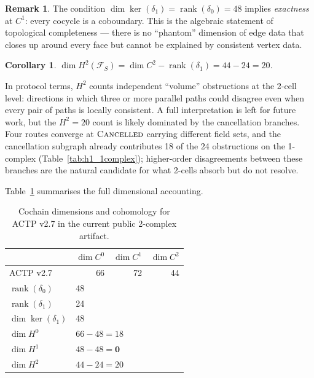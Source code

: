 \documentclass[11pt]{article}
\theoremstyle{plain}
\newtheorem{corollary}[theorem]{Corollary}
\theoremstyle{definition}
\newtheorem{remark}[theorem]{Remark}
\newcommand{\Fsh}{\mathcal{F}}         %
\newcommand{\Czero}{C^{0}}
\newcommand{\Cone}{C^{1}}
\newcommand{\Ctwo}{C^{2}}
\newcommand{\Hzero}{H^{0}}
\newcommand{\Hone}{H^{1}}
\newcommand{\Htwo}{H^{2}}
\newcommand{\deltazero}{\delta_{0}}
\newcommand{\deltaone}{\delta_{1}}
\newcommand{\rank}{\operatorname{rank}}
\newcommand{\dimn}{\operatorname{dim}}
\newcommand{\sCANC}{\textsc{Cancelled}}
\begin{document}
\begin{remark}
The condition $\dimn\ker(\deltaone) = \rank(\deltazero) = 48$ implies
\emph{exactness} at $\Cone$: every cocycle is a coboundary.  This is
the algebraic statement of topological completeness --- there is no
``phantom'' dimension of edge data that closes up around every face but
cannot be explained by consistent vertex data.
\end{remark}

\begin{corollary}
$\dimn\Htwo(\Fsh_S) = \dimn\Ctwo - \rank(\deltaone) = 44 - 24 = 20$.
\end{corollary}

In protocol terms, $\Htwo$ counts independent ``volume'' obstructions at the
2-cell level: directions in which three or more parallel paths could disagree
even when every pair of paths is locally consistent.  A full interpretation
is left for future work, but the $\Htwo = 20$ count is likely dominated by
the cancellation branches.  Four routes converge at $\sCANC$ carrying
different field sets, and the cancellation subgraph already contributes 18 of
the 24 obstructions on the 1-complex (Table~\ref{tab:h1_1complex});
higher-order disagreements between these branches are the natural candidate
for what 2-cells absorb but do not resolve.

Table~\ref{tab:dimensions} summarises the full dimensional accounting.

\begin{table}[h]
\centering
\caption{Cochain dimensions and cohomology for ACTP v2.7 in the current public 2-complex artifact.}
\label{tab:dimensions}
\begin{tabular}{@{}lrrr@{}}
\toprule
 & $\dimn\Czero$ & $\dimn\Cone$ & $\dimn\Ctwo$ \\
\midrule
ACTP v2.7 & 66 & 72 & 44 \\
\midrule
$\rank(\deltazero)$ & \multicolumn{3}{l}{48} \\
$\rank(\deltaone)$  & \multicolumn{3}{l}{24} \\
$\dimn\ker(\deltaone)$ & \multicolumn{3}{l}{48} \\
\midrule
$\dimn\Hzero$ & \multicolumn{3}{l}{$66 - 48 = 18$} \\
$\dimn\Hone$  & \multicolumn{3}{l}{$48 - 48 = \mathbf{0}$} \\
$\dimn\Htwo$  & \multicolumn{3}{l}{$44 - 24 = 20$} \\
\bottomrule
\end{tabular}
\end{table}
\end{document}
